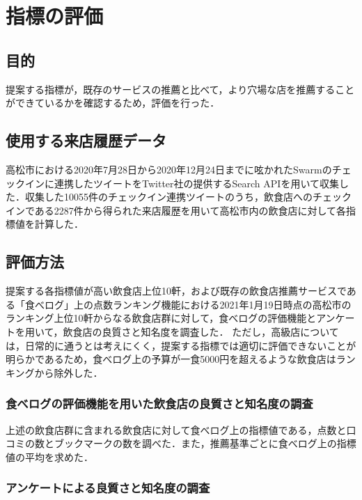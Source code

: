 \chapter{指標の評価}



\label{chap:experiment}

\section{目的}
提案する指標が，既存のサービスの推薦と比べて，より穴場な店を推薦することができているかを確認するため，評価を行った．

\section{使用する来店履歴データ}
高松市における2020年7月28日から2020年12月24日までに呟かれたSwarmのチェックインに連携したツイートをTwitter社の提供するSearch APIを用いて収集した．収集した10055件のチェックイン連携ツイートのうち，飲食店へのチェックインである2287件から得られた来店履歴を用いて高松市内の飲食店に対して各指標値を計算した．

\section{評価方法}
提案する各指標値が高い飲食店上位10軒，および既存の飲食店推薦サービスである「食べログ」上の点数ランキング機能における2021年1月19日時点の高松市のランキング上位10軒からなる飲食店群に対して，食べログの評価機能とアンケートを用いて，飲食店の良質さと知名度を調査した．
ただし，高級店については，日常的に通うとは考えにくく，提案する指標では適切に評価できないことが明らかであるため，食べログ上の予算が一食5000円を超えるような飲食店はランキングから除外した．
	\subsection{食べログの評価機能を用いた飲食店の良質さと知名度の調査}\label{exp:scrutiny}

		上述の飲食店群に含まれる飲食店に対して食べログ上の指標値である，点数と口コミの数とブックマークの数を調べた．また，推薦基準ごとに食べログ上の指標値の平均を求めた．

	\subsection{アンケートによる良質さと知名度の調査}\label{exp:questionnaire}

